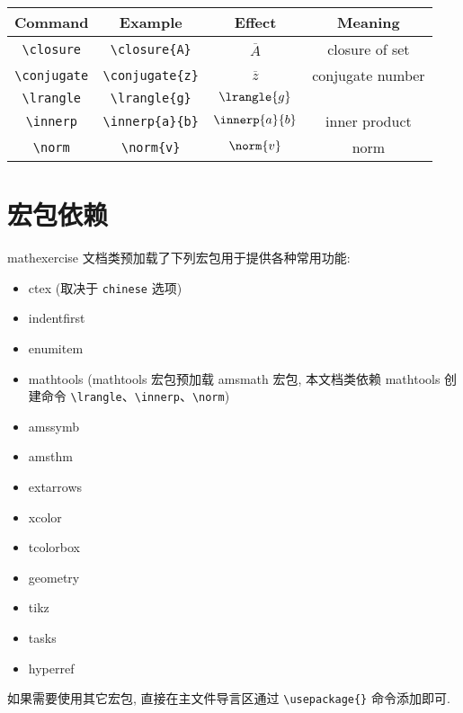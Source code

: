 \documentclass{article}
\newcommand{\cls}[1]{\textsf{#1}}
\newcommand{\option}[1]{\texttt{#1}}
\newcommand{\pkg}[1]{\textsf{#1}}
\begin{document}
\begin{center}
  \begin{tabular}{cccc}
    \toprule
      Command & Example & Effect & Meaning \\
    \midrule
      \verb|\closure| & \verb|\closure{A}| & $\overline{A}$ & closure of set \\
      \verb|\conjugate| & \verb|\conjugate{z}| & $\overline{z}$ & conjugate number \\
      \verb|\lrangle| & \verb|\lrangle{g}| & $\lrangle{g}$ &  \\
      \verb|\innerp| & \verb|\innerp{a}{b}| & $\innerp{a}{b}$ & inner product \\
      \verb|\norm| & \verb|\norm{v}| & $\norm{v}$ & norm \\
    \bottomrule
  \end{tabular}
\end{center}


\section{宏包依赖}

\cls{mathexercise} 文档类预加载了下列宏包用于提供各种常用功能:
\begin{itemize}
  \item \pkg{ctex} (取决于 \option{chinese} 选项)
  \item \pkg{indentfirst}
  \item \pkg{enumitem}
  \item \pkg{mathtools} (\pkg{mathtools} 宏包预加载 \pkg{amsmath} 宏包, 
    本文档类依赖 \pkg{mathtools} 创建命令 \verb|\lrangle|、\verb|\innerp|、\verb|\norm|)
  \item \pkg{amssymb}
  \item \pkg{amsthm}
  \item \pkg{extarrows}
  \item \pkg{xcolor}
  \item \pkg{tcolorbox}
  \item \pkg{geometry}
  \item \pkg{tikz}
  \item \pkg{tasks}
  \item \pkg{hyperref}
\end{itemize}

如果需要使用其它宏包, 直接在主文件导言区通过 \verb|\usepackage{}| 命令添加即可.
\end{document}
